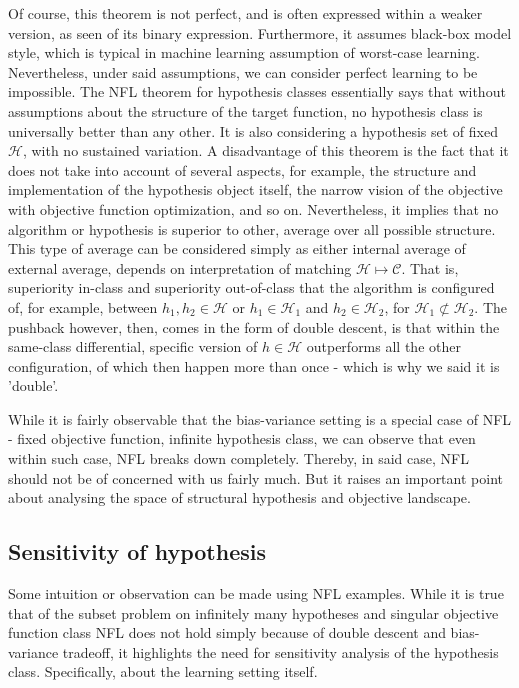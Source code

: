 \documentclass[10pt]{article} %
\begin{document}
Of course, this theorem is not perfect, and is often expressed within a weaker version, as seen of its binary expression. Furthermore, it assumes black-box model style, which is typical in machine learning assumption of worst-case learning. Nevertheless, under said assumptions, we can consider perfect learning to be impossible. The NFL theorem for hypothesis classes essentially says that without assumptions about the structure of the target function, no hypothesis class is universally better than any other. It is also considering a hypothesis set of fixed $\mathcal{H}$, with no sustained variation. A disadvantage of this theorem is the fact that it does not take into account of several aspects, for example, the structure and implementation of the hypothesis object itself, the narrow vision of the objective with objective function optimization, and so on. Nevertheless, it implies that no algorithm or hypothesis is superior to other, average over all possible structure. This type of average can be considered simply as either internal average of external average, depends on interpretation of matching $\mathcal{H}\mapsto \mathcal{C}$. That is, superiority in-class and superiority out-of-class that the algorithm is configured of, for example, between $h_{1},h_{2}\in \mathcal{H}$ or $h_{1}\in \mathcal{H}_{1}$ and $h_{2}\in \mathcal{H}_{2}$, for $\mathcal{H}_{1}\not\subset \mathcal{H}_{2}$. The pushback however, then, comes in the form of double descent, is that within the same-class differential, specific version of $h\in\mathcal{H}$ outperforms all the other configuration, of which then happen more than once - which is why we said it is 'double'. 

While it is fairly observable that the bias-variance setting is a special case of NFL - fixed objective function, infinite hypothesis class, we can observe that even within such case, NFL breaks down completely. Thereby, in said case, NFL should not be of concerned with us fairly much. But it raises an important point about analysing the space of structural hypothesis and objective landscape. 

\subsection{Sensitivity of hypothesis}

Some intuition or observation can be made using NFL examples. While it is true that of the subset problem on infinitely many hypotheses and singular objective function class NFL does not hold simply because of double descent and bias-variance tradeoff, it highlights the need for sensitivity analysis of the hypothesis class. Specifically, about the learning setting itself. 
\end{document}
